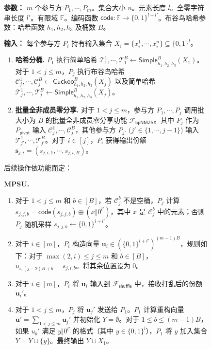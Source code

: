 \begin{figure}[!htbp]
\begin{framed}
\begin{minipage}[c]{\textwidth}
\begin{trivlist}
\item \textbf{参数：} $m$ 个参与方 $P_1, \cdots, P_m$。集合大小 $n$。元素长度 $l$。全零字符串长度 $l'$。有限域 $\mathbb{F}$。编码函数 $\mathsf{code}:\mathbb{F} \to \{0,1\}^{l+l'}$。布谷鸟哈希参数：哈希函数 $h_1, h_2, h_3$ 及桶数 $B$。
\item \textbf{输入：} 每个参与方 $P_i$ 持有输入集合 $X_i = \{x_i^1,\cdots, x_i^n\} \subseteq \{0,1\}^l$。

\begin{enumerate}[itemsep=2pt,topsep=0pt,parsep=0pt,leftmargin=15pt]
\item \textbf{哈希分桶.} $P_1$ 执行简单哈希 $\mathcal{T}_1^1, \cdots, \mathcal{T}_1^B \gets \mathsf{Simple}_{h_1,h_2,h_3}^B(X_1)$。对于 $1 < j \le m $，$P_j$ 执行布谷鸟哈希 $\mathcal{C}_j^1, \cdots, \mathcal{C}_j^B \gets \mathsf{Cuckoo}_{h_1,h_2,h_3}^B(X_j)$ 以及简单哈希 $\mathcal{T}_j^1, \cdots, \mathcal{T}_j^B \gets \mathsf{Simple}_{h_1,h_2,h_3}^B(X_j)$。
\item \textbf{批量全非成员零分享.} 对于 $1 < j \le m$，参与方 $P_1, \cdots, P_j$ 调用批大小为 $B$ 的批量全非成员零分享功能 $\mathcal{F}_{\mathsf{bpNMZS}}$。其中 $P_j$ 作为 $P_\mathsf{pivot}$ 输入 $\mathcal{C}_j^1, \cdots, \mathcal{C}_j^B$，其他参与方 $P_{j'}$ ($j' \in \{1,\cdots, j-1\}$) 输入 $\mathcal{T}_{j'}^1, \cdots, \mathcal{T}_{j'}^B$。对于 $i \in [j]$，$P_i$ 获得输出份额 $\textbf{s}_{j,i}=(s_{j,i,1},\cdots,s_{j,i,B})$。
\end{enumerate}

后续操作依功能而定：

    \textbf{MPSU.} 
    \begin{enumerate}[itemsep=2pt,topsep=0pt,parsep=0pt,leftmargin=15pt] \addtocounter{enumi}{2}
        \item 对于 $1 < j \le m$ 和 $b \in [B]$，若 $\mathcal{C}_j^b$ 不是空桶，$P_j$ 计算 $s_{j,j,b} = \mathsf{code}(s_{j,j,b}) \oplus (x \Vert 0^{l'})$，其中 $x$ 是 $\mathcal{C}_j^b$ 中的元素；否则 $P_j$ 随机采样 $s_{j,j,b} \gets \{0,1\}^{l+l'}$。
        \item 对于 $i \in [m]$，$P_i$ 构造向量 $\textbf{u}_i \in (\{0,1\}^{l+l'})^{(m-1)B}$，规则如下：对于 $\max(2,i) \le j \le m$ 和 $b \in [B]$，$u_{i,(j-2)B+b} = s_{j,i,b}$。将其余位置设为 $0$。
        \item 对于 $i \in [m]$，$P_i$ 将 $\textbf{u}_i$ 输入到 $\mathcal{F}_{\mathsf{shuffle}}$ 中，接收打乱后的份额 $\textbf{u}_{i}'$。
        \item 对于 $1 < j \le m$，$P_j$ 将 $\textbf{u}_j'$ 发送给 $P_1$。$P_1$ 计算重构向量 $\textbf{u}' = \sum_{1 < j \le m} \textbf{u}_j'$ 并初始化 $Y = \emptyset$。对于 $1 \le b \le (m-1)B$，如果 $u_b'$ 满足 $y \Vert 0^{l'}$ 的格式（其中 $y \in \{0,1\}^l$），$P_1$ 将 $y$ 加入集合 $Y = Y \cup \{y\}$。最终输出 $Y \cup X_1$。
    \end{enumerate}
    

\end{trivlist}
\end{minipage}
\end{framed}
\end{figure}
